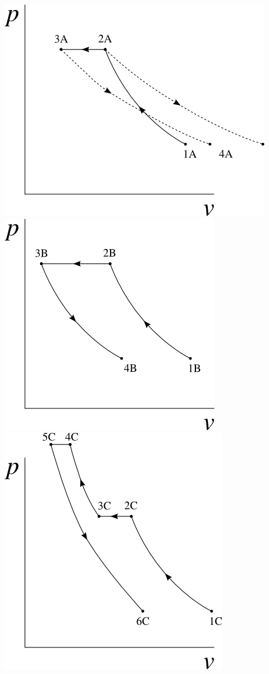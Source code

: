 \begin{description}
			\includegraphics[height=\solutiondiagramwidth]{images/exo_sol_pv_pack_1.png}
			\includegraphics[height=\solutiondiagramwidth]{images/exo_sol_pv_pack_2.png}
			\includegraphics[width=\solutiondiagramwidth]{images/exo_sol_pv_pack_3.png}

\end{description}
